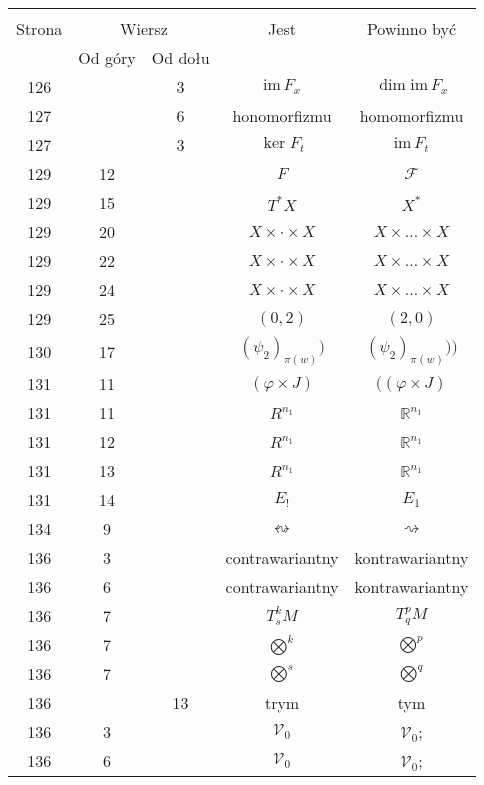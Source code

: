 \documentclass[a4paper,11pt]{article}
\newcommand{\mb}{\mathbb}
\newcommand{\mc}{\mathcal}
\newcommand{\mr}{\mathrm}
\newcommand{\ld}{\ldots}
\newcommand{\ti}{\times}
\newcommand{\im}{\mr{im}}
\newcommand{\vp}{\varphi}
\newcommand{\R}{\mb{R}}
\newcommand{\F}{\mc{F}}
\newcommand{\V}{\mc{V}}
\begin{document}
\begin{center}
  \begin{tabular}{|c|c|c|c|c|}
    \hline
    & \multicolumn{2}{c|}{} & & \\
    Strona & \multicolumn{2}{c|}{Wiersz} & Jest
                              & Powinno być \\ \cline{2-3}
    & Od góry & Od dołu &  &  \\
    \hline
    126 & &  3 & $\im \, F_{ x }$ & $\dim\im \, F_{ x }$ \\
    127 & &  6 & honomorfizmu & homomorfizmu \\
    127 & &  3 & $\ker F_{ t }$ & $\im \, F_{ t }$ \\
    129 & 12 & & $F$ & $\F$ \\
    129 & 15 & & $T^{ * }X$ & $X^{ * }$ \\
    129 & 20 & & $X \ti \cdot \ti X$ & $X \ti \ld \ti X$ \\
    129 & 22 & & $X \ti \cdot \ti X$ & $X \ti \ld \ti X$ \\
    129 & 24 & & $X \ti \cdot \ti X$ & $X \ti \ld \ti X$ \\
    129 & 25 & & $( 0, 2 )$ & $( 2, 0 )$ \\
    130 & 17 & & $( \psi_{ 2 } )_{ \pi( w ) })$
           & $( \psi_{ 2 } )_{ \pi( w ) }) \big)$ \\
    131 & 11 & & $( \vp \ti J )$ & $( ( \vp \ti J )$ \\
    131 & 11 & & $R^{ n_{ 1 } }$ & $\R^{ n_{ 1 } }$ \\
    131 & 12 & & $R^{ n_{ 1 } }$ & $\R^{ n_{ 1 } }$ \\
    131 & 13 & & $R^{ n_{ 1 } }$ & $\R^{ n_{ 1 } }$ \\
    131 & 14 & & $E_{ ! }$ & $E_{ 1 }$ \\
    134 &  9 & & $\leftrightsquigarrow$ & $\rightsquigarrow$ \\
    136 &  3 & & contrawariantny & kontrawariantny \\
    136 &  6 & & contrawariantny & kontrawariantny \\
    136 &  7 & & $T^{ k }_{ s }M$ & $T^{ p }_{ q }M$ \\
    136 &  7 & & $\bigotimes^{ k }$ & $\bigotimes^{ p }$ \\
    136 &  7 & & $\bigotimes^{ s }$ & $\bigotimes^{ q }$ \\
    136 & & 13 & trym & tym \\
    136 &  3 & & $\V_{ 0 }$ & $\V_{ 0 }$; \\
    136 &  6 & & $\V_{ 0 }$ & $\V_{ 0 }$; \\

\end{tabular}
\end{center}
\end{document}
